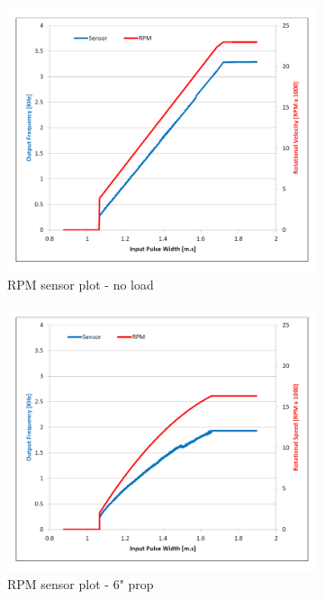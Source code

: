 \newpage
\begin{figure}[htbp]
\begin{subfigure}{0.5\textwidth}
\centering
\includegraphics[width=\textwidth]{graphs/rpm-sensor-noload}
\caption{RPM sensor plot - no load}
\label{fig:rpm-sensor-noload}
\end{subfigure}
\begin{subfigure}{0.5\textwidth}
\centering
\includegraphics[width=\textwidth]{graphs/rpm-sensor-prop}
\caption{RPM sensor plot - 6" prop}
\label{fig:rpm-sensor-prop}
\end{subfigure}
\caption{}
\label{fig:rpm-sensor}
\end{figure}
